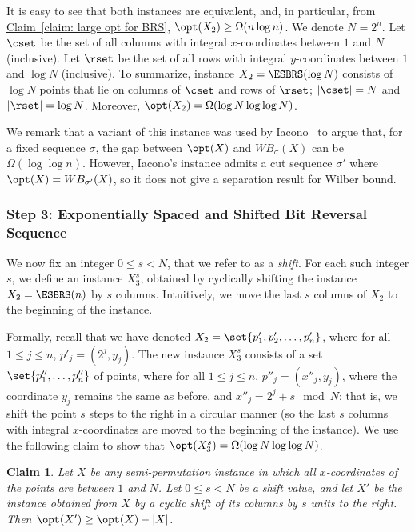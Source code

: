 \documentclass[11pt]{article}
\numberwithin{equation}{section}
\newtheorem{claim}[theorem]{Claim}
\theoremstyle{definition}
\theoremstyle{plain}
\newcommand{\expref}[2]{\hyperref[#2]{#1~\ref{#2}}}
\begin{document}
It is easy to see that both instances are equivalent, and, in particular, from \expref{Claim}{claim: large opt for BRS}, $\opt(X_2)\geq \Omega(n\log n)$.
We denote $N=2^n$. Let $\cset$ be the set of all columns with integral $x$-coordinates between $1$ and $N$ (inclusive). Let $\rset$ be the set of all rows with integral $y$-coordinates between $1$ and $\log N$ (inclusive).
 To summarize, instance $X_2=\ESBRS(\log N)$ consists of $\log N$ points that lie on columns of $\cset$ and rows of $\rset$; $|\cset|= N$ and $|\rset|=\log N$. Moreover, $\opt(X_2)=\Omega(\log N\log\log N)$.


We remark that a variant of this instance was used by Iacono~\cite{in_pursuit} to argue that, for a fixed sequence $\sigma$, the gap between $\opt(X)$ and $WB_{\sigma}(X)$ can be $\Omega(\log \log n)$. 
However, Iacono's instance admits a cut sequence $\sigma'$ where $\opt(X) = WB_{\sigma'}(X)$, so it does not give a separation result for Wilber bound.    


%
%
%
\subsubsection{Step 3: Exponentially Spaced and Shifted Bit Reversal Sequence}
%
%
%
%
We now fix an integer $0\leq s< N$, that we refer to as a \emph{shift}. For each such integer $s$, we define an instance $X^s_3$, obtained by cyclically shifting the instance $X_2=\ESBRS(n)$ by $s$ columns. Intuitively, we move the last $s$ columns of $X_2$ to the beginning of the instance. 

Formally, recall that we have denoted $X_2=\set{p'_1,p'_2,\ldots,p'_{n}}$, where for all $1\leq j\leq n$, 
$p'_j=(2^j,y_j)$. The new instance $X_3^s$ consists of a set $\set{p''_1,\ldots,p''_n}$ of points, where for  all $1\leq j\leq n$, $p''_j=(x''_j,y_j)$, where the coordinate $y_j$ remains the same as before, and $x''_j=2^j+s\mod N$; that is, we shift the point $s$ steps to the right in a circular manner (so the last $s$ columns with integral $x$-coordinates are moved to the beginning of the instance). 
We use the following claim to show that $\opt(X_3^s)=\Omega(\log N\log\log N)$.

\begin{claim}\label{claim: shifting does not hurt opt}
	Let $X$ be any semi-permutation instance in which all $x$-coordinates of the points are between $1$ and $N$. Let $0\leq s<N$ be a shift value, and let $X'$ be the instance obtained from $X$ by a cyclic shift of its columns by $s$ units to the right.  
Then $\opt(X')\geq \opt(X)-|X|$.
\end{claim}
\end{document}
